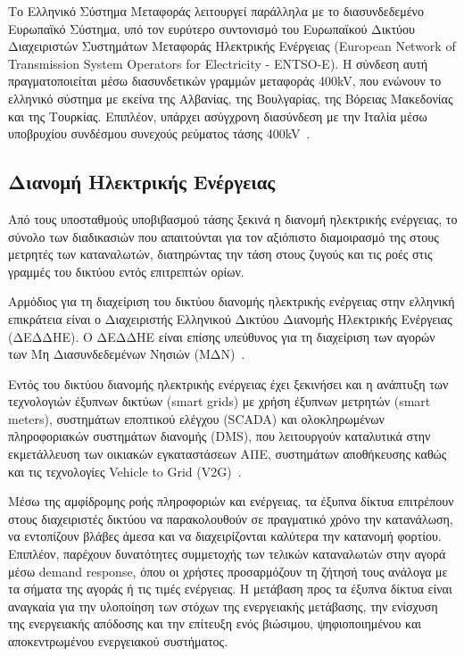Το Ελληνικό Σύστημα Μεταφοράς λειτουργεί παράλληλα με το διασυνδεδεμένο Ευρωπαϊκό Σύστημα, υπό τον ευρύτερο συντονισμό του Ευρωπαϊκού Δικτύου Διαχειριστών Συστημάτων Μεταφοράς Ηλεκτρικής Ενέργειας (European Network of Transmission System Operators for Electricity - ENTSO-E). Η σύνδεση αυτή πραγματοποιείται μέσω διασυνδετικών γραμμών μεταφοράς 400kV, που ενώνουν το ελληνικό σύστημα με εκείνα της Αλβανίας, της Βουλγαρίας, της Βόρειας Μακεδονίας και της Τουρκίας. Επιπλέον, υπάρχει ασύγχρονη διασύνδεση με την Ιταλία μέσω υποβρυχίου συνδέσμου συνεχούς ρεύματος τάσης 400kV~\cite{admie-system}.

\subsection{Διανομή Ηλεκτρικής Ενέργειας}
\label{subsec:distribution}

Από τους υποσταθμούς υποβιβασμού τάσης ξεκινά η διανομή ηλεκτρικής ενέργειας, το σύνολο των διαδικασιών που απαιτούνται για τον αξιόπιστο διαμοιρασμό της στους μετρητές των καταναλωτών, διατηρώντας την τάση στους ζυγούς και τις ροές στις γραμμές του δικτύου εντός επιτρεπτών ορίων.

Αρμόδιος για τη διαχείριση του δικτύου διανομής ηλεκτρικής ενέργειας στην ελληνική επικράτεια είναι ο Διαχειριστής Ελληνικού Δικτύου Διανομής Ηλεκτρικής Ενέργειας (ΔΕΔΔΗΕ). Ο ΔΕΔΔΗΕ είναι επίσης υπεύθυνος για τη διαχείριση των αγορών των Μη Διασυνδεδεμένων Νησιών (ΜΔΝ)~\cite{nomos4001}.

Εντός του δικτύου διανομής ηλεκτρικής ενέργειας έχει ξεκινήσει και η ανάπτυξη των τεχνολογιών έξυπνων δικτύων (smart grids) με χρήση έξυπνων μετρητών (smart meters), συστημάτων εποπτικού ελέγχου (SCADA) και ολοκληρωμένων πληροφοριακών συστημάτων διανομής (DMS), που λειτουργούν καταλυτικά στην εκμετάλλευση των οικιακών εγκαταστάσεων ΑΠΕ, συστημάτων αποθήκευσης καθώς και τις τεχνολογίες Vehicle to Grid (V2G)~\cite{fang2012}.

Μέσω της αμφίδρομης ροής πληροφοριών και ενέργειας, τα έξυπνα δίκτυα επιτρέπουν στους διαχειριστές δικτύου να παρακολουθούν σε πραγματικό χρόνο την κατανάλωση, να εντοπίζουν βλάβες άμεσα και να διαχειρίζονται καλύτερα την κατανομή φορτίου. Επιπλέον, παρέχουν δυνατότητες συμμετοχής των τελικών καταναλωτών στην αγορά μέσω demand response, όπου οι χρήστες προσαρμόζουν τη ζήτησή τους ανάλογα με τα σήματα της αγοράς ή τις τιμές ενέργειας. Η μετάβαση προς τα έξυπνα δίκτυα είναι αναγκαία για την υλοποίηση των στόχων της ενεργειακής μετάβασης, την ενίσχυση της ενεργειακής απόδοσης και την επίτευξη ενός βιώσιμου, ψηφιοποιημένου και αποκεντρωμένου ενεργειακού συστήματος.


